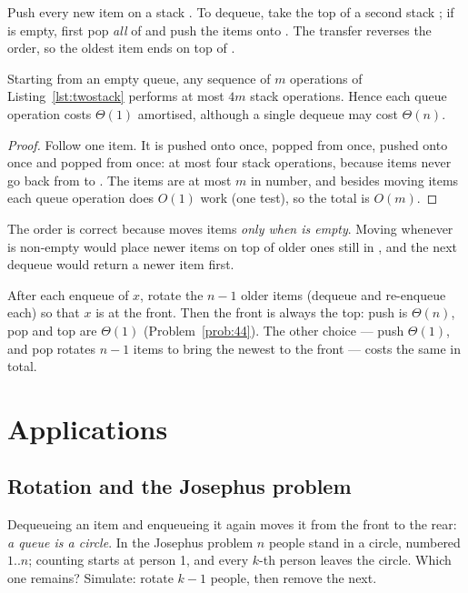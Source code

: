  Push every new item on a stack . To dequeue, take
the top of a second stack ; if  is empty, first pop \emph{all} of
 and push the items onto . The transfer reverses the order, so the oldest
item ends on top of .


\begin{theorem}\label{thm:twostack}
Starting from an empty queue, any sequence of $m$ operations of
Listing~\ref{lst:twostack} performs at most $4m$ stack operations. Hence each queue
operation costs $\Theta(1)$ amortised, although a single dequeue may cost $\Theta(n)$.
\end{theorem}
\begin{proof}
Follow one item. It is pushed onto  once, popped from  once, pushed onto
 once and popped from  once: at most four stack operations, because
items never go back from  to . The items are at most $m$ in number, and
besides moving items each queue operation does $O(1)$ work (one  test),
so the total is $O(m)$.
\end{proof}

The order is correct because  moves items \emph{only when  is empty}.
Moving whenever  is non-empty would place newer items on top of older ones still
in , and the next dequeue would return a newer item first.

 After each enqueue of $x$, rotate the $n-1$ older items
(dequeue and re-enqueue each) so that $x$ is at the front. Then the front is always the
top: push is $\Theta(n)$, pop and top are $\Theta(1)$ (Problem~\ref{prob:44}). The
other choice --- push $\Theta(1)$, and pop rotates $n-1$ items to bring the newest to the
front --- costs the same in total.

\section{Applications}

\subsection{Rotation and the Josephus problem}

Dequeueing an item and enqueueing it again moves it from the front to the rear:
\emph{a queue is a circle}. In the Josephus problem $n$ people stand in a circle,
numbered $1..n$; counting starts at person 1, and every $k$-th person leaves the circle.
Which one remains? Simulate: rotate $k-1$ people, then remove the next.

